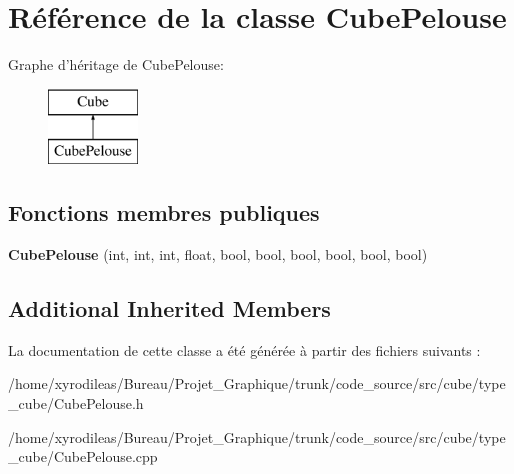 \hypertarget{classCubePelouse}{\section{Référence de la classe Cube\-Pelouse}
\label{classCubePelouse}
}
Graphe d'héritage de Cube\-Pelouse\-:\begin{figure}[H]
\begin{center}
\leavevmode
\includegraphics[height=2.000000cm]{classCubePelouse}
\end{center}
\end{figure}
\subsection*{Fonctions membres publiques}
\begin{DoxyCompactItemize}
\item 
\hypertarget{classCubePelouse_a501b5442ea45c7f53d7e34d5d80b3387}{{\bfseries Cube\-Pelouse} (int, int, int, float, bool, bool, bool, bool, bool, bool)}\label{classCubePelouse_a501b5442ea45c7f53d7e34d5d80b3387}

\end{DoxyCompactItemize}
\subsection*{Additional Inherited Members}


La documentation de cette classe a été générée à partir des fichiers suivants \-:\begin{DoxyCompactItemize}
\item 
/home/xyrodileas/\-Bureau/\-Projet\-\_\-\-Graphique/trunk/code\-\_\-source/src/cube/type\-\_\-cube/Cube\-Pelouse.\-h\item 
/home/xyrodileas/\-Bureau/\-Projet\-\_\-\-Graphique/trunk/code\-\_\-source/src/cube/type\-\_\-cube/Cube\-Pelouse.\-cpp\end{DoxyCompactItemize}
